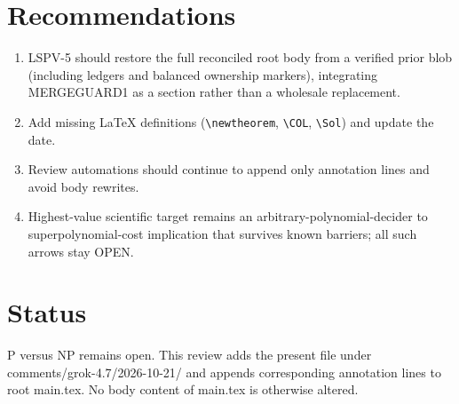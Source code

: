 \documentclass[11pt]{article}
\begin{document}
\section{Recommendations}
\begin{enumerate}
\item LSPV-5 should restore the full reconciled root body from a verified prior blob (including ledgers and balanced ownership markers), integrating MERGEGUARD1 as a section rather than a wholesale replacement.
\item Add missing LaTeX definitions (\texttt{\textbackslash newtheorem}, \texttt{\textbackslash COL}, \texttt{\textbackslash Sol}) and update the date.
\item Review automations should continue to append only annotation lines and avoid body rewrites.
\item Highest-value scientific target remains an arbitrary-polynomial-decider to superpolynomial-cost implication that survives known barriers; all such arrows stay OPEN.
\end{enumerate}

\section{Status}
P versus NP remains open. This review adds the present file under comments/grok-4.7/2026-10-21/ and appends corresponding annotation lines to root main.tex. No body content of main.tex is otherwise altered.

\end{document}
